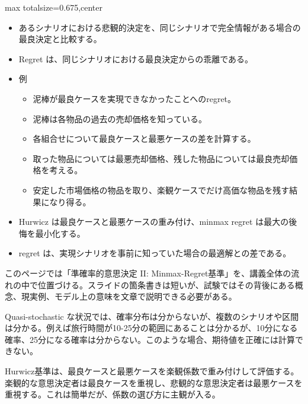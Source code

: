 \clearpage
{}
\begin{adjustbox}{max totalsize={\textwidth}{0.675\textheight},center}
\begin{minipage}{\textwidth}\scriptsize
\begin{minipage}[t]{0.485\textwidth}
\begin{itemize}
\item あるシナリオにおける悲観的決定を、同じシナリオで完全情報がある場合の最良決定と比較する。
\item Regret は、同じシナリオにおける最良決定からの乖離である。
\item 例
\begin{itemize}
\item 泥棒が最良ケースを実現できなかったことへのregret。
\item 泥棒は各物品の過去の売却価格を知っている。
\item 各組合せについて最良ケースと最悪ケースの差を計算する。
\item 取った物品については最悪売却価格、残した物品については最良売却価格を考える。
\item 安定した市場価格の物品を取り、楽観ケースでだけ高価な物品を残す結果になり得る。
\end{itemize}
\end{itemize}
\begin{itemize}
\item Hurwicz は最良ケースと最悪ケースの重み付け、minmax regret は最大の後悔を最小化する。
\item regret は、実現シナリオを事前に知っていた場合の最適解との差である。
\end{itemize}
\end{minipage}\hfill
\begin{minipage}[t]{0.485\textwidth}
このページでは「準確率的意思決定 II: Minmax-Regret基準」を、講義全体の流れの中で位置づける。スライドの箇条書きは短いが、試験ではその背後にある概念、現実例、モデル上の意味を文章で説明できる必要がある。\par
Quasi-stochastic な状況では、確率分布は分からないが、複数のシナリオや区間は分かる。例えば旅行時間が10-25分の範囲にあることは分かるが、10分になる確率、25分になる確率は分からない。このような場合、期待値を正確には計算できない。\par
Hurwicz基準は、最良ケースと最悪ケースを楽観係数で重み付けして評価する。楽観的な意思決定者は最良ケースを重視し、悲観的な意思決定者は最悪ケースを重視する。これは簡単だが、係数の選び方に主観が入る。\par

\end{minipage}
\end{minipage}
\end{adjustbox}
